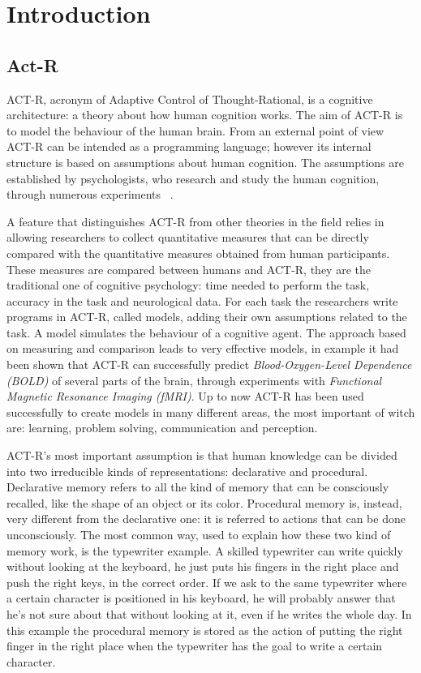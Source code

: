 \chapter{Introduction}
\section{Act-R}


ACT-R, acronym of Adaptive Control of Thought-Rational, is a cognitive architecture: a theory about how human cognition works. 
The aim of \mbox{ACT-R} is to model the behaviour of the human brain. From an external point of view \mbox{ACT-R} can be intended as a programming language; however its internal structure is based on assumptions about human cognition. The assumptions are established by psychologists, who research and study the human cognition, through numerous experiments ~\cite{Allen94}. 

A feature that distinguishes \mbox{ACT-R} from other theories in the field relies in allowing researchers to collect quantitative measures that can be directly compared with the quantitative measures obtained from human participants. These measures are compared between humans and \mbox{ACT-R}, they are the traditional one of cognitive psychology: time needed to perform the task, accuracy in the task and neurological data. For each task the researchers write programs in \mbox{ACT-R}, called models, adding their own assumptions related to the task. A model simulates the behaviour of a cognitive agent. The approach based on measuring and comparison leads to very effective models, in example it had been shown that \mbox{ACT-R} can successfully predict \emph{Blood-Oxygen-Level Dependence (BOLD)} of several parts of the brain, through experiments with \emph{Functional Magnetic Resonance Imaging (fMRI)}.
Up to now \mbox{ACT-R} has been used successfully to create models in many different areas, the most important of witch are: learning, problem solving, communication and perception.

ACT-R's most important assumption is that human knowledge can be divided into two irreducible kinds of representations: declarative and procedural.
Declarative memory refers to all the kind of memory that can be consciously recalled, like the shape of an object or its color. Procedural memory is, instead, very different from the declarative one: it is referred to actions that can be done unconsciously. The most common way, used to explain how these two kind of memory work, is the typewriter example.
A skilled typewriter can write quickly without looking at the keyboard, he just puts his fingers in the right place and push the right keys, in the correct order. If we ask to the same typewriter where a certain character is positioned in his keyboard, he will probably answer that he's not sure about that without looking at it, even if he writes the whole day. In this example the procedural memory is stored as the action of putting the right finger in the right place when the typewriter has the goal to write a certain character.


